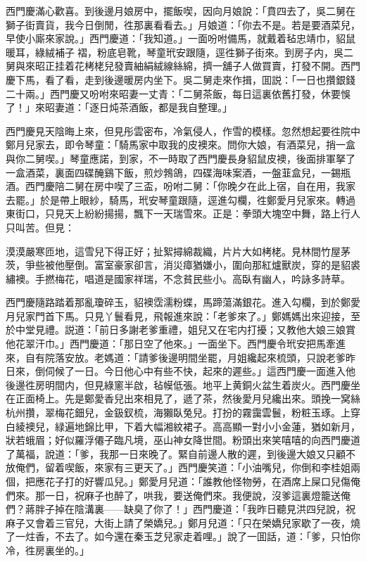 西門慶滿心歡喜。到後邊月娘房中，擺飯喫，因向月娘說：「賁四去了，吳二舅在獅子街賣貨，我今日倒閒，徃那裏看看去。」月娘道：「你去不是。若是要酒菜兒，早使小廝來家說。」西門慶道：「我知道。」一面吩咐備馬，就戴着毡忠靖巾，貂鼠暖耳，綠絨補子𧜽褶，粉底皂靴，琴童玳安跟隨，逕徃獅子街來。到房子内，吳二舅與來昭正挂着花栲栳兒發賣紬絹絨線絲綿，擠一舖子人做買賣，打發不開。西門慶下馬，看了看，走到後邊暖房内坐下。吳二舅走來作揖，囬説：「一日也攢銀錢二十兩。」西門慶又吩咐來昭妻一丈青：「二舅茶飯，每日這裏依舊打發，休要悞了！」來昭妻道：「逐日炖茶酒飯，都是我自整理。」

西門慶見天陰晦上來，但見彤雲密布，冷氣侵人，作雪的模樣。忽然想起要徃院中鄭月兒家去，即令琴童：「騎馬家中取我的皮襖來。問你大娘，有酒菜兒，捎一盒與你二舅喫。」琴童應諾，到家，不一時取了西門慶長身貂鼠皮襖，後面排軍拏了一盒酒菜，裏面四碟醃鷄下飯，煎炒鵓鴿，四碟海味案酒，一盤韮盒兒，一錫瓶酒。西門慶陪二舅在房中喫了三盃，吩咐二舅：「你晚夕在此上宿，自在用，我家去罷。」於是帶上眼紗，騎馬，玳安琴童跟隨，逕進勾欄，徃鄭愛月兒家來。轉過東街口，只見天上紛紛揚揚，飄下一天瑞雪來。正是：拳頭大塊空中舞，路上行人只叫苦。但見：

\begin{myquote}
漠漠嚴寒匝地，這雪兒下得正好；扯絮撏綿裁織，片片大如栲栳。見林間竹屋茅茨，爭些被他壓倒。富室豪家卻言，消災瘴猶嫌小，圍向那紅爐獸炭，穿的是貂裘繡襖。手撚梅花，唱道是國家祥瑞，不念貧民些小。高臥有幽人，吟詠多詩草。
\end{myquote}

西門慶隨路踏着那亂瓊碎玉，貂襖霑濡粉蝶，馬蹄蕩滿銀花。進入勾欄，到於鄭愛月兒家門首下馬。只見丫鬟看見，飛報進來說：「老爹來了。」鄭媽媽出來迎接，至於中堂見禮。説道：「前日多謝老爹重禮，姐兒又在宅内打擾；又教他大娘三娘賞他花翠汗巾。」西門慶道：「那日空了他來。」一面坐下。西門慶令玳安把馬牽進來，自有院落安放。老媽道：「請爹後邊明間坐罷，月姐纔起來梳頭，只說老爹昨日來，倒伺候了一日。今日他心中有些不快，起來的遲些。」這西門慶一面進入他後邊徃房明間内，但見綠窻半啟，毡幙低張。地平上黄銅火盆生着炭火。西門慶坐在正面椅上。先是鄭愛香兒出來相見了，遞了茶，然後愛月兒纔出來。頭挽一窝絲杭州攢，翠梅花鈿兒，金鈒釵梳，海獺臥兔兒。打扮的霧靄雲鬟，粉粧玉琢。上穿白綾襖兒，緑遍地錦比甲，下着大幅湘紋裙子。高高顯一對小小金蓮，猶如新月，狀若蛾眉；好似羅浮僊子臨凡境，巫山神女降世間。粉頭出來笑嘻嘻的向西門慶道了萬福，說道：「爹，我那一日來晚了。緊自前邊人散的遲，到後邊大娘又只顧不放俺們，留着喫飯，來家有三更天了。」西門慶笑道：「小油嘴兒，你倒和李桂姐兩個，把應花子打的好響瓜兒。」鄭愛月兒道：「誰教他怪物勞，在酒席上屎口兒傷俺們來。那一日，祝麻子也醉了，哄我，要送俺們來。我便說，沒爹這裏燈籠送俺們？蔣胖子掉在陰溝裏——缺臭了你了！」西門慶道：「我昨日聽見洪四兒說，祝麻子又會着三官兒，大街上請了榮嬌兒。」鄭月兒道：「只在榮嬌兒家歇了一夜，燒了一炷香，不去了。如今還在秦玉芝兒家走着哩。」說了一囬話，道：「爹，只怕你冷，徃房裏坐的。」

